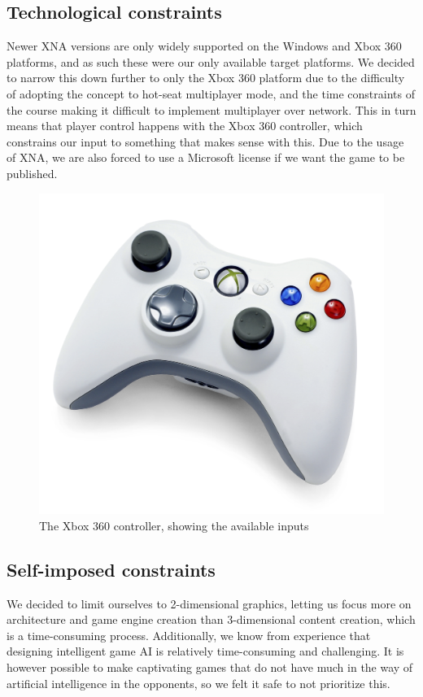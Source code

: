 \subsection{Technological constraints}
Newer XNA versions are only widely supported on the Windows and Xbox 360
platforms, and as such these were our only available target platforms. We decided
to narrow this down further to only the Xbox 360 platform due to the difficulty
of adopting the concept to hot-seat multiplayer mode, and the time constraints
of the course making it difficult to implement multiplayer over network. This
in turn means that player control happens with the Xbox 360 controller, which
constrains our input to something that makes sense with this. Due to the usage
of XNA, we are also forced to use a Microsoft license if we want the game to be
published.
\begin{figure}
  \includegraphics[scale=0.2]{graphics/controller}
  \caption{The Xbox 360 controller, showing the available inputs}
\end{figure}

\subsection{Self-imposed constraints}
We decided to limit ourselves to 2-dimensional graphics, letting us focus more
on architecture and game engine creation than 3-dimensional content creation,
which is a time-consuming process. Additionally, we know from experience that
designing intelligent game AI is relatively time-consuming and challenging.
It is however possible to make captivating games that do not have much in the way
of artificial intelligence in the opponents, so we felt it safe to not prioritize
this. 

